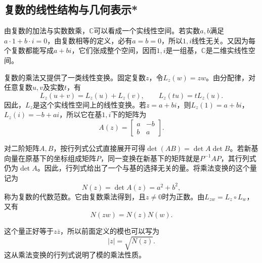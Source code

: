 \subsection{复数的线性结构与几何表示*}
由复数的加法与实数数乘，\(\mathbb{C}\)可以看成一个实线性空间。若实数\(a , b\)满足\(a \cdot 1 + b \cdot i = 0\)，由复数相等的定义，必有\(a = b = 0\)，所以\(1 , i\)线性无关。又因为每个复数都能写成\(a + b i\)，它们张成整个空间，因而\(1 , i\)是一组基，\(\mathbb{C}\)是二维实线性空间。

复数的乘法又提供了一类线性变换。固定复数\(z\)，令\(L_{z} \left( w \right) = z w\)。由分配律，对任意复数\(u , v\)及实数\(t\)，有
\begin{equation}
    L_{z} \left( u + v \right) = L_{z} \left( u \right) + L_{z} \left( v \right) , \qquad
    L_{z} \left( t u \right) = t L_{z} \left( u \right) .
\end{equation}
因此，\(L_{z}\)是这个实线性空间上的线性变换。若\(z = a + b i\)，则\(L_{z} \left( 1 \right) = a + b i\)，\(L_{z} \left( i \right) = - b + a i\)，所以它在基\(1 , i\)下的矩阵为
\begin{equation}\label{eq:complex-matrix}
    A \left( z \right) = \left[ \begin{matrix}a & - b \\ b & a\end{matrix} \right] .
\end{equation}

对二阶矩阵\(A , B\)，按行列式公式直接展开可得\(\det \left( A B \right) = \det A \det B\)。若新基向量在原基下的坐标组成矩阵\(P\)，同一变换在新基下的矩阵就是\(P^{- 1} A P\)，其行列式仍为\(\det A\)。因此，行列式给出了一个与基的选择无关的量。将乘法变换的这个量记为
\begin{equation}
    N \left( z \right) = \det A \left( z \right) = a^{2} + b^{2} ,
\end{equation}
称为复数的{\heiti{}代数范数}。它由复数乘法得到，且\(z \ne 0\)时为正数。由\(L_{z w} = L_{z} \circ L_{w}\)，又有
\begin{equation}
    N \left( z w \right) = N \left( z \right) N \left( w \right) .
\end{equation}

这个量正好等于\(z \overline{z}\)，所以前面定义的模也可以写为
\begin{equation}
    \left| z \right| = \sqrt{N \left( z \right)} .
\end{equation}
这从乘法变换的行列式说明了模的乘法性质。

